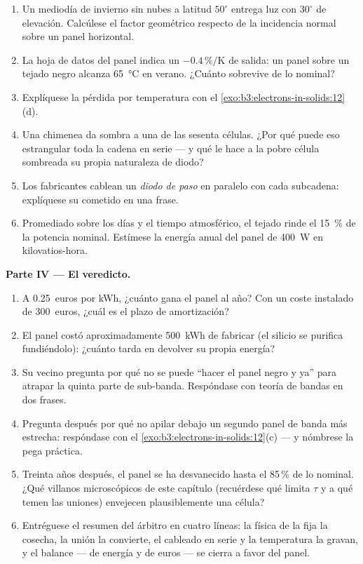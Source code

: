 \begin{problem}
\begin{enumerate}[resume]
  \item Un mediodía de invierno sin nubes a latitud $50^\circ$ entrega
        luz con $30^\circ$ de elevación. Calcúlese el factor
        geométrico respecto de la incidencia normal sobre un panel
        horizontal.
  \item La hoja de datos del panel indica un $-0.4\,\%/\text{K}$ de salida:
        un panel sobre un tejado negro alcanza \qty{65}{\celsius} en verano.
        ¿Cuánto sobrevive de lo nominal?
  \item Explíquese la pérdida por temperatura con el
        \cref{exo:b3:electrons-in-solids:12}(d).
  \item Una chimenea da sombra a una de las sesenta células. ¿Por qué puede eso
        estrangular toda la cadena en serie --- y qué le hace a la pobre célula
        sombreada su propia naturaleza de diodo?
  \item Los fabricantes cablean un \emph{diodo de paso} en paralelo con cada
        subcadena: explíquese su cometido en una frase.
  \item Promediado sobre los días y el tiempo atmosférico, el tejado rinde
        el \qty{15}{\percent} de la potencia nominal. Estímese la energía anual
        del panel de \qty{400}{W} en kilovatios-hora.
\end{enumerate}

\medskip\noindent\textbf{Parte IV --- El veredicto.}

\begin{enumerate}[resume]
  \item A \qty{0.25}{euros} por kWh, ¿cuánto gana el panel
        al año? Con un coste instalado de \qty{300}{euros},
        ¿cuál es el plazo de amortización?
  \item El panel costó aproximadamente \qty{500}{kWh} de fabricar
        (el silicio se purifica fundiéndolo): ¿cuánto tarda en
        devolver su propia energía?
  \item Su vecino pregunta por qué no se puede
        ``hacer el panel negro y ya'' para atrapar la quinta parte de sub-banda. Respóndase
        con teoría de bandas en dos frases.
  \item Pregunta después por qué no apilar debajo un segundo panel de banda
        más estrecha: respóndase con el
        \cref{exo:b3:electrons-in-solids:12}(c) --- y nómbrese la
        pega práctica.
  \item Treinta años después, el panel se ha desvanecido hasta el 85\,\% de lo
        nominal. ¿Qué villanos microscópicos de este capítulo
        (recuérdese qué limita $\tau$ y a qué temen las uniones)
        envejecen plausiblemente una célula?
  \item Entréguese el resumen del árbitro en cuatro líneas: la física de la 
        fija la cosecha, la unión la convierte, el cableado en serie
        y la temperatura la gravan, y el balance --- de energía
        y de euros --- se cierra a favor del panel.
\end{enumerate}
\end{problem}
